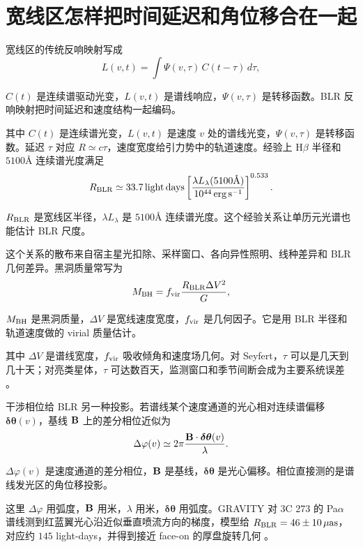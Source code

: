 \section{宽线区怎样把时间延迟和角位移合在一起}

宽线区的传统反响映射写成
\begin{equation}
  L(v,t)=\int \Psi(v,\tau)\,C(t-\tau)\,d\tau ,
  \label{eq:ch12-09}
\end{equation}
\begin{formulaexplain}
\(C(t)\) 是连续谱驱动光变，\(L(v,t)\) 是谱线响应，\(\Psi(v,\tau)\) 是转移函数。BLR 反响映射把时间延迟和速度结构一起编码。
\end{formulaexplain}
其中 \(C(t)\) 是连续谱光变，\(L(v,t)\) 是速度 \(v\) 处的谱线光变，\(\Psi(v,\tau)\) 是转移函数。延迟 \(\tau\) 对应 \(R\simeq c\tau\)，速度宽度给引力势中的轨道速度。经验上 H\(\beta\) 半径和 \(5100\text{\AA}\) 连续谱光度满足
\begin{equation}
  R_{\rm BLR}\simeq 33.7\,{\rm light\,days}
  \left[\frac{\lambda L_\lambda(5100\text{\AA})}{10^{44}\,\mathrm{erg\,s^{-1}}}\right]^{0.533}.
  \label{eq:ch12-10}
\end{equation}
\begin{formulaexplain}
\(R_{\rm BLR}\) 是宽线区半径，\(\lambda L_\lambda\) 是 \(5100\text{\AA}\) 连续谱光度。这个经验关系让单历元光谱也能估计 BLR 尺度。
\end{formulaexplain}
这个关系的散布来自宿主星光扣除、采样窗口、各向异性照明、线种差异和 BLR 几何差异。黑洞质量常写为
\begin{equation}
  M_{\rm BH}=f_{\rm vir}\frac{R_{\rm BLR}\Delta V^2}{G},
  \label{eq:ch12-11}
\end{equation}
\begin{formulaexplain}
\(M_{\rm BH}\) 是黑洞质量，\(\Delta V\) 是宽线速度宽度，\(f_{\rm vir}\) 是几何因子。它是用 BLR 半径和轨道速度做的 virial 质量估计。
\end{formulaexplain}
其中 \(\Delta V\) 是谱线宽度，\(f_{\rm vir}\) 吸收倾角和速度场几何。对 Seyfert，\(\tau\) 可以是几天到几十天；对亮类星体，\(\tau\) 可达数百天，监测窗口和季节间断会成为主要系统误差 \citep{1982ApJ...255..419B,1993PASP..105..247P,2013ApJ...767..149B}。

干涉相位给 BLR 另一种投影。若谱线某个速度通道的光心相对连续谱偏移 \(\boldsymbol{\delta\theta}(v)\)，基线 \({\bf B}\) 上的差分相位近似为
\begin{equation}
  \Delta\varphi(v)\simeq
  2\pi\frac{{\bf B}\cdot\boldsymbol{\delta\theta}(v)}{\lambda}.
  \label{eq:ch12-12}
\end{equation}
\begin{formulaexplain}
\(\Delta\varphi(v)\) 是速度通道的差分相位，\({\bf B}\) 是基线，\(\boldsymbol{\delta\theta}\) 是光心偏移。相位直接测的是谱线发光区的角位移投影。
\end{formulaexplain}
这里 \(\Delta\varphi\) 用弧度，\({\bf B}\) 用米，\(\lambda\) 用米，\(\boldsymbol{\delta\theta}\) 用弧度。GRAVITY 对 3C 273 的 Pa\(\alpha\) 谱线测到红蓝翼光心沿近似垂直喷流方向的梯度，模型给 \(R_{\rm BLR}=46\pm10\,\mu{\rm as}\)，对应约 \(145\) light-days，并得到接近 face-on 的厚盘旋转几何 \citep{2018Natur.563..657G}。

